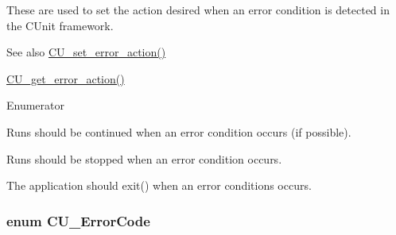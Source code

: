 These are used to set the action desired when an error condition is detected in the C\+Unit framework. \begin{DoxySeeAlso}{See also}
\hyperlink{group___framework_ga58f4bdc1a05802f89005a487768b3d75}{C\+U\+\_\+set\+\_\+error\+\_\+action()} 

\hyperlink{group___framework_gab2e98ce95448aa5a04a4875bc8152d6e}{C\+U\+\_\+get\+\_\+error\+\_\+action()} 
\end{DoxySeeAlso}
\begin{Desc}
\item[Enumerator]\par
\begin{description}
\item[{\em 
\hypertarget{group___framework_gga50053b4edbfc96a88027dd57c580ca35a8d128d9f1ef78818816d62dd5d0a7043}{C\+U\+E\+A\+\_\+\+I\+G\+N\+O\+R\+E}\label{group___framework_gga50053b4edbfc96a88027dd57c580ca35a8d128d9f1ef78818816d62dd5d0a7043}
}]Runs should be continued when an error condition occurs (if possible). \item[{\em 
\hypertarget{group___framework_gga50053b4edbfc96a88027dd57c580ca35a88e2ea08ccaf759fdd948051b0c156a7}{C\+U\+E\+A\+\_\+\+F\+A\+I\+L}\label{group___framework_gga50053b4edbfc96a88027dd57c580ca35a88e2ea08ccaf759fdd948051b0c156a7}
}]Runs should be stopped when an error condition occurs. \item[{\em 
\hypertarget{group___framework_gga50053b4edbfc96a88027dd57c580ca35a5356f9f4514df11bc7543ac8ea71d66b}{C\+U\+E\+A\+\_\+\+A\+B\+O\+R\+T}\label{group___framework_gga50053b4edbfc96a88027dd57c580ca35a5356f9f4514df11bc7543ac8ea71d66b}
}]The application should exit() when an error conditions occurs. \end{description}
\end{Desc}
\hypertarget{group___framework_ga743a2a025ee3eb792d7d85f0eea347e6}{
\subsubsection[{C\+U\+\_\+\+Error\+Code}]{\setlength{\rightskip}{0pt plus 5cm}enum {\bf C\+U\+\_\+\+Error\+Code}}}\label{group___framework_ga743a2a025ee3eb792d7d85f0eea347e6}


